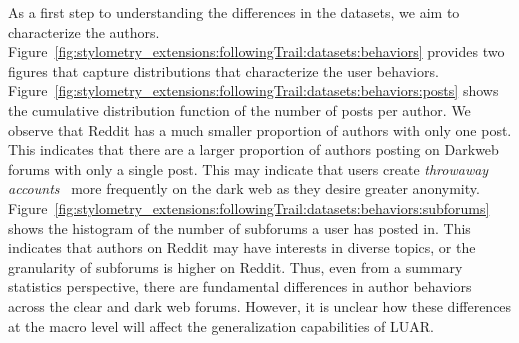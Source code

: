 As a first step to understanding the differences in the datasets, we aim to characterize the authors.
Figure~\ref{fig:stylometry_extensions:followingTrail:datasets:behaviors} provides two figures that capture distributions that characterize the user behaviors.
Figure~\ref{fig:stylometry_extensions:followingTrail:datasets:behaviors:posts} shows the cumulative distribution function of the number of posts per author.
We observe that Reddit has a much smaller proportion of authors with only one post.
This indicates that there are a larger proportion of authors posting on Darkweb forums with only a single post.
This may indicate that users create \textit{throwaway accounts}~\cite{leavitt2015throwaway} more frequently on the dark web as they desire greater anonymity.
Figure~\ref{fig:stylometry_extensions:followingTrail:datasets:behaviors:subforums} shows the histogram of the number of subforums a user has posted in.
This indicates that authors on Reddit may have interests in diverse topics, or the granularity of subforums is higher on Reddit.
Thus, even from a summary statistics perspective, there are fundamental differences in author behaviors across the clear and dark web forums.
However, it is unclear how these differences at the macro level will affect the generalization capabilities of LUAR.


